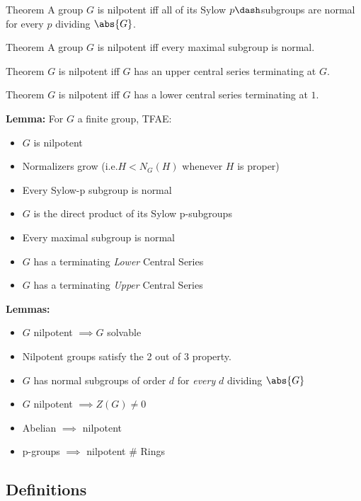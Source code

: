 Theorem A group \(G\) is nilpotent iff all of its Sylow
\(p\dash\)subgroups are normal for every \(p\) dividing \(\abs{G}\).

Theorem A group \(G\) is nilpotent iff every maximal subgroup is normal.

Theorem \(G\) is nilpotent iff \(G\) has an upper central series
terminating at \(G\).

Theorem \(G\) is nilpotent iff \(G\) has a lower central series
terminating at \(1\).

\textbf{Lemma:} For \(G\) a finite group, TFAE:

\begin{itemize}
\tightlist
\item
  \(G\) is nilpotent
\item
  Normalizers grow (i.e.\(H < N_G(H)\) whenever \(H\) is proper)
\item
  Every Sylow-p subgroup is normal
\item
  \(G\) is the direct product of its Sylow p-subgroups
\item
  Every maximal subgroup is normal
\item
  \(G\) has a terminating \emph{Lower} Central Series
\item
  \(G\) has a terminating \emph{Upper} Central Series
\end{itemize}

\textbf{Lemmas:}

\begin{itemize}
\tightlist
\item
  \(G\) nilpotent \(\implies G\) solvable
\item
  Nilpotent groups satisfy the 2 out of 3 property.
\item
  \(G\) has normal subgroups of order \(d\) for \emph{every} \(d\)
  dividing \(\abs{G}\)
\item
  \(G\) nilpotent \(\implies Z(G) \neq 0\)
\item
  Abelian \(\implies\) nilpotent
\item
  p-groups \(\implies\) nilpotent \# Rings
\end{itemize}

\hypertarget{definitions}{%
\subsection{Definitions}\label{definitions}}

